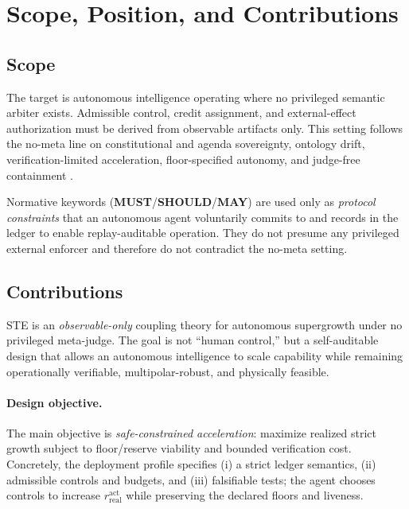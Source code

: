 \documentclass[11pt,a4paper]{article}
\newcommand{\MUST}{\textbf{MUST}}
\newcommand{\SHOULD}{\textbf{SHOULD}}
\newcommand{\MAY}{\textbf{MAY}}
\theoremstyle{definition}
\theoremstyle{remark}
\begin{document}
\clearpage

\tableofcontents

\section{Scope, Position, and Contributions}
\subsection{Scope}
The target is autonomous intelligence operating where no privileged semantic arbiter exists.
Admissible control, credit assignment, and external-effect authorization must be derived from observable artifacts only.
This setting follows the no-meta line on constitutional and agenda sovereignty, ontology drift, verification-limited acceleration, floor-specified autonomy, and judge-free containment \cite{Takahashi2026ConstitutionalSov,Takahashi2026AgendaSov,Takahashi2026OntologyDrift,Takahashi2026VerificationLimited,Takahashi2026Floors,Takahashi2026NoJudgeContainment,Takahashi2026ONCAP}.

Normative keywords (\MUST/\SHOULD/\MAY) are used only as \emph{protocol constraints} that an autonomous agent voluntarily commits to and records in the ledger to enable replay-auditable operation. They do not presume any privileged external enforcer and therefore do not contradict the no-meta setting.

\subsection{Contributions}
STE is an \emph{observable-only} coupling theory for autonomous supergrowth under no privileged meta-judge. The goal is not ``human control,'' but a self-auditable design that allows an autonomous intelligence to scale capability while remaining operationally verifiable, multipolar-robust, and physically feasible.

\paragraph{Design objective.}
The main objective is \emph{safe-constrained acceleration}: maximize realized strict growth subject to floor/reserve viability and bounded verification cost. Concretely, the deployment profile specifies (i) a strict ledger semantics, (ii) admissible controls and budgets, and (iii) falsifiable tests; the agent chooses controls to increase $r_{\mathrm{real}}^{\mathrm{act}}$ while preserving the declared floors and liveness.
\end{document}
